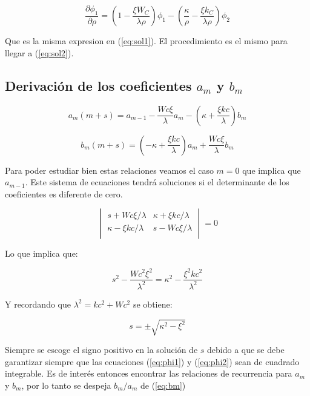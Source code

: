 \documentclass[a4paper, 12pt]{article} %
\begin{document}
\begin{equation}
\dfrac{\partial \phi_1}{\partial \rho} = \left( 1 - \dfrac{\xi W_C}{\lambda \rho} \right) \phi_1 
- \left( \dfrac{\kappa}{\rho} - \dfrac{\xi k_C}{\lambda \rho} \right) \phi_2
\end{equation}

Que es la misma expresion en (\ref{eq:sol1}). El procedimiento es el mismo para llegar a (\ref{eq:sol2}).

\subsection{Derivaci\'on de los coeficientes $a_m$ y $b_m$}

\begin{equation}\label{eq:am}
a_m(m+s) = a_{m-1} - \dfrac{Wc\xi}{\lambda}a_m - \left(\kappa + \dfrac{\xi kc}{\lambda}\right) b_m
\end{equation}

\begin{equation}\label{eq:bm}
b_m(m+s) = \left( -\kappa + \dfrac{\xi kc}{\lambda}  \right)a_m + \dfrac{Wc \xi}{\lambda}b_m
\end{equation}

Para poder estudiar bien estas relaciones veamos el caso $m=0$ que implica que $a_{m-1}$. Este 
sistema de ecuaciones tendr\'a soluciones si el determinante de los coeficientes es diferente de
cero. 

\[
\begin{vmatrix}
s + Wc \xi/\lambda & \kappa + \xi kc/\lambda \\
\kappa - \xi kc/\lambda & s-Wc \xi/\lambda \\
\end{vmatrix}
= 0
\]

Lo que implica que:

\[
s^2 - \dfrac{Wc^2 \xi^2}{\lambda^2} = \kappa^2 - \dfrac{\xi^2 kc^2}{\lambda^2}
\]

Y recordando que $\lambda^2 = kc^2 + Wc^2$ se obtiene:

\[
s = \pm \sqrt{\kappa^2 - \xi^2}
\]

Siempre se escoge el signo positivo en la soluci\'on de $s$ debido a que se debe garantizar siempre
que las ecuaciones (\ref{eq:phi1})  y (\ref{eq:phi2}) sean de cuadrado integrable. Es de inter\'es entonces
encontrar las relaciones de recurrencia para $a_m$ y $b_m$, por lo tanto se despeja $b_m/a_m$ de (\ref{eq:bm})
\end{document}
